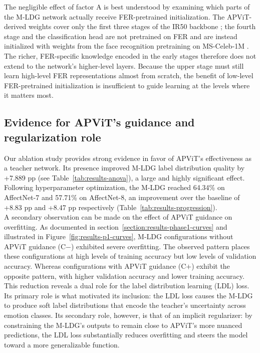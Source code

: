 The negligible effect of factor A is best understood by examining which parts of the M-LDG network actually receive FER-pretrained initialization. The APViT-derived weights cover only the first three stages of the IR50 backbone \cite{deng2019ir50}; the fourth stage and the classification head are not pretrained on FER and are instead initialized with weights from the face recognition pretraining on MS-Celeb-1M \cite{guo2016msceleb}. The richer, FER-specific knowledge encoded in the early stages therefore does not extend to the network's higher-level layers. Because the upper stage must still learn high-level FER representations almost from scratch, the benefit of low-level FER-pretrained initialization is insufficient to guide learning at the levels where it matters most.

\subsection{Evidence for APViT's guidance and regularization role}
\label{section:discussion-factorc}

Our ablation study provides strong evidence in favor of APViT's effectiveness as a teacher network. Its presence improved M-LDG label distribution quality by +7.889 pp (see Table~\ref{tab:results-anova}), a large and highly significant effect. Following hyperparameter optimization, the M-LDG reached 64.34\% on AffectNet-7 and 57.71\% on AffectNet-8, an improvement over the baseline of +8.83 pp and +8.47 pp respectively (Table~\ref{tab:results-progression}).\\

A secondary observation can be made on the effect of APViT guidance on overfitting. As documented in section~\ref{section:results-phase1-curves} and illustrated in Figure~\ref{fig:results-p1-curves}, M-LDG configurations without APViT guidance (C$-$) exhibited severe overfitting. The observed pattern places these configurations at high levels of training accuracy but  low levels of validation accuracy. Whereas configurations with APViT guidance (C$+$) exhibit the opposite pattern, with higher validation accuracy and lower training accuracy. This reduction reveals a dual role for the label distribution learning (LDL) loss. Its primary role is what motivated its inclusion: the LDL loss causes the M-LDG to produce soft label distributions that encode the teacher's uncertainty across emotion classes. Its secondary role, however, is that of an implicit regularizer: by constraining the M-LDG's outputs to remain close to APViT's more nuanced predictions, the LDL loss substantially reduces overfitting and steers the model toward a more generalizable function.

